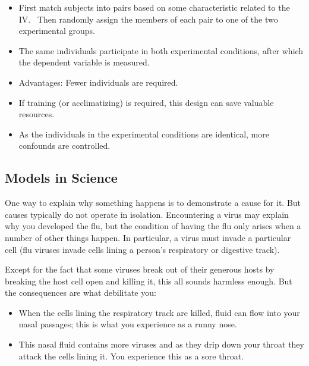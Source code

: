 \begin{refsection}
\begin{itemize}
\end{itemize}


\begin{itemize}
\item First match subjects into pairs based on some characteristic related to the IV.  Then randomly assign the members of each pair to one of the two experimental groups.

\item The same individuals participate in both experimental conditions, after which the dependent variable is measured.

\item Advantages: Fewer individuals are required.

\item If training (or acclimatizing) is required, this design can save valuable resources.

\item As the individuals in the experimental conditions are identical, more confounds are controlled.

\end{itemize}

\subsection{Models in Science}
\label{modelsinscience}

One way to explain why something happens is to demonstrate a cause for it. But causes typically do not operate in isolation. Encountering a virus may explain why you developed the flu, but the condition of having the flu only arises when a number of other things happen. In particular, a virus must invade a particular cell (flu viruses invade cells lining a person’s respiratory or digestive track). 

Except for the fact that some viruses break out of their generous hosts by breaking the host cell open and killing it, this all sounds harmless enough. But the consequences are what debilitate you:

\begin{itemize}
\item When the cells lining the respiratory track are killed, fluid can flow into your nasal passages; this is what you experience as a runny nose.

\item This nasal fluid contains more viruses and as they drip down your throat they attack the cells lining it. You experience this as a sore throat.


\end{itemize}
\end{refsection}
